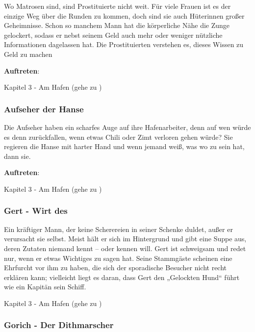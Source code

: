 Wo Matrosen sind, sind Prostituierte nicht weit. Für viele Frauen ist es der einzige Weg über die Runden zu kommen, doch sind sie auch Hüterinnen großer Geheimnisse. Schon so manchem Mann hat die körperliche Nähe die Zunge gelockert, sodass er nebst seinem Geld auch mehr oder weniger nützliche Informationen dagelassen hat. Die Prostituierten verstehen es, dieses Wissen zu Geld zu machen


\textbf{Auftreten}:

Kapitel 3 - Am Hafen (gehe zu \blue{\ref{Hafen}})

\subsubsection*{Aufseher der Hanse}
\label{Aufseher}

Die Aufseher haben ein scharfes Auge auf ihre Hafenarbeiter, denn auf wen würde es denn zurückfallen, wenn etwas Chili oder Zimt verloren gehen würde? Sie regieren die Hanse mit harter Hand und wenn jemand weiß, was wo zu sein hat, dann sie.


\textbf{Auftreten}:

Kapitel 3 - Am Hafen (gehe zu \blue{\ref{Hafen}})

\subsubsection*{Gert - Wirt des }
\label{Gert}

Ein kräftiger Mann, der keine Scherereien in seiner Schenke duldet, außer er verursacht sie selbst. Meist hält er sich im Hintergrund und gibt eine Suppe aus, deren Zutaten niemand kennt – oder kennen will. Gert ist schweigsam und redet nur, wenn er etwas Wichtiges zu sagen hat. Seine Stammgäste scheinen eine Ehrfurcht vor ihm zu haben, die sich der sporadische Besucher nicht recht erklären kann; vielleicht liegt es daran, dass Gert den „Gelockten Hund“ führt wie ein Kapitän sein Schiff.

Kapitel 3 - Am Hafen (gehe zu \blue{\ref{imhund}})

\subsubsection*{Gorich - Der Dithmarscher}
\label{Gorich}

